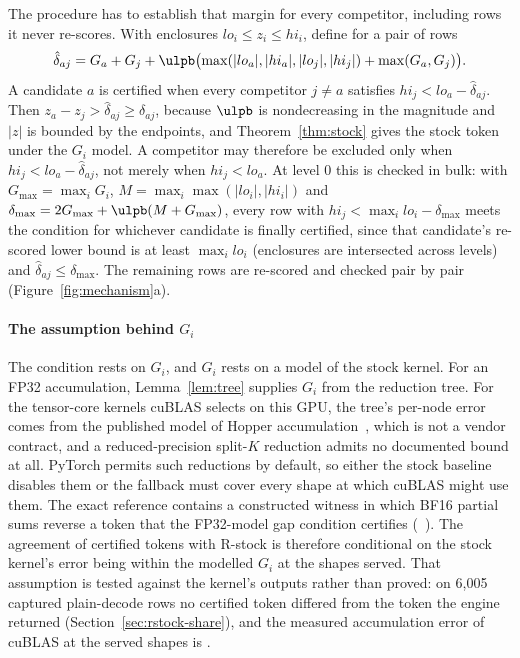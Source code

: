 The procedure has to establish that margin for every competitor, including rows it never re-scores. With enclosures $lo_i\le z_i\le hi_i$, define for a pair of rows
\[\hat\delta_{aj}=G_a+G_j+\ulpb\bigl(\max(|lo_a|,|hi_a|,|lo_j|,|hi_j|)+\max(G_a,G_j)\bigr).\]
A candidate $a$ is certified when every competitor $j\ne a$ satisfies $hi_j<lo_a-\hat\delta_{aj}$. Then $z_a-z_j>\hat\delta_{aj}\ge\delta_{aj}$, because $\ulpb$ is nondecreasing in the magnitude and $|z|$ is bounded by the endpoints, and Theorem~\ref{thm:stock} gives the stock token under the $G_i$ model. A competitor may therefore be excluded only when $hi_j<lo_a-\hat\delta_{aj}$, not merely when $hi_j<lo_a$. At level 0 this is checked in bulk: with $G_{\max}=\max_iG_i$, $M=\max_i\max(|lo_i|,|hi_i|)$ and $\delta_{\max}=2G_{\max}+\ulpb(M+G_{\max})$, every row with $hi_j<\max_ilo_i-\delta_{\max}$ meets the condition for whichever candidate is finally certified, since that candidate's re-scored lower bound is at least $\max_ilo_i$ (enclosures are intersected across levels) and $\hat\delta_{aj}\le\delta_{\max}$. The remaining rows are re-scored and checked pair by pair (Figure~\ref{fig:mechanism}a).

\paragraph{The assumption behind $G_i$} The condition rests on $G_i$, and $G_i$ rests on a model of the stock kernel. For an FP32 accumulation, Lemma~\ref{lem:tree} supplies $G_i$ from the reduction tree. For the tensor-core kernels cuBLAS selects on this GPU, the tree's per-node error comes from the published model of Hopper accumulation~\cite{khattak2026}, which is not a vendor contract, and a reduced-precision split-$K$ reduction admits no documented bound at all. PyTorch permits such reductions by default, so either the stock baseline disables them or the fallback must cover every shape at which cuBLAS might use them. The exact reference contains a constructed witness in which BF16 partial sums reverse a token that the FP32-model gap condition certifies (~). The agreement of certified tokens with R-stock is therefore conditional on the stock kernel's error being within the modelled $G_i$ at the shapes served. That assumption is tested against the kernel's outputs rather than proved: on 6,005 captured plain-decode rows no certified token differed from the token the engine returned (Section~\ref{sec:rstock-share}), and the measured accumulation error of cuBLAS at the served shapes is .


